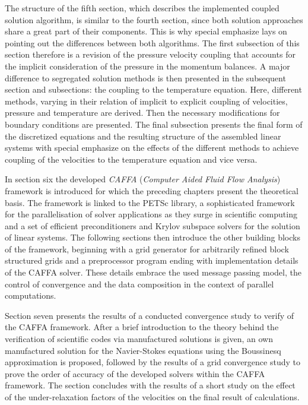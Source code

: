 The structure of the fifth section, which describes the implemented coupled solution algorithm, is similar to the fourth section, since both solution approaches share a great part of their components. This is why special emphasize lays on pointing out the differences between both algorithms. The first subsection of this section therefore is a revision of the pressure velocity coupling that accounts for the implicit consideration of the pressure in the momentum balances. A major difference to segregated solution methods is then presented in the subsequent section and subsections: the coupling to the temperature equation. Here, different methods, varying in their relation of implicit to explicit coupling of velocities, pressure and temperature are derived. Then the necessary modifications for boundary conditions are presented. The final subsection presents the final form of the discretized equations and the resulting structure of the assembled linear systems with special emphasize on the effects of the different methods to achieve coupling of the velocities to the temperature equation and vice versa.

In section six the developed \emph{CAFFA} (\emph{Computer Aided Fluid Flow Analysis}) framework is introduced for which the preceding chapters present the theoretical basis. The framework is linked to the PETSc library, a sophisticated framework for the parallelisation of solver applications as they surge in scientific computing and a set of efficient preconditioners and Krylov subspace solvers for the solution of linear systems. The following sections then introduce the other building blocks of the framework, beginning with a grid generator for arbitrarily refined block structured grids and a preprocessor program ending with implementation details of the CAFFA solver. These details embrace the used message passing model, the control of convergence and the data composition in the context of parallel computations.

Section seven presents the results of a conducted convergence study to verify of the CAFFA framework. After a brief introduction to the theory behind the verification of scientific codes via manufactured solutions is given, an own manufactured solution for the Navier-Stokes equations using the Boussinesq approximation is proposed, followed by the results of a grid convergence study to prove the order of accuracy of the developed solvers within the CAFFA framework. The section concludes with the results of a short study on the effect of the under-relaxation factors of the velocities on the final result of calculations.

